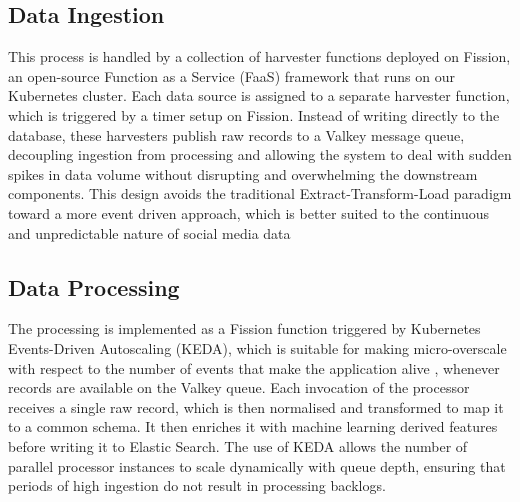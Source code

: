 \subsection{Data Ingestion}
This process is handled by a collection of harvester functions deployed on Fission, an open-source Function as a Service (FaaS) framework \cite{fission2026docs} that runs on our Kubernetes cluster. Each data source is assigned to a separate harvester function, which is triggered by a timer setup on Fission. Instead of writing directly to the database, these harvesters publish raw records to a Valkey message queue, decoupling ingestion from processing and allowing the system to deal with sudden spikes in data volume without disrupting and overwhelming the downstream components. This design avoids the traditional Extract-Transform-Load \cite{vassiliadis2009survey} paradigm toward a more event driven approach, which is better suited to the continuous and unpredictable nature of social media data

\subsection{Data Processing}
The processing is implemented as a Fission function triggered by Kubernetes Events-Driven Autoscaling (KEDA), which is suitable for making micro-overscale with respect to the number of events that make the application alive \cite{molleti2022kubernetes}, whenever records are available on the Valkey queue. Each invocation of the processor receives a single raw record, which is then normalised and transformed to map it to a common schema. It then enriches it with machine learning derived features before writing it to Elastic Search. The use of KEDA allows the number of parallel processor instances to scale dynamically with queue depth, ensuring that periods of high ingestion do not result in processing backlogs.


